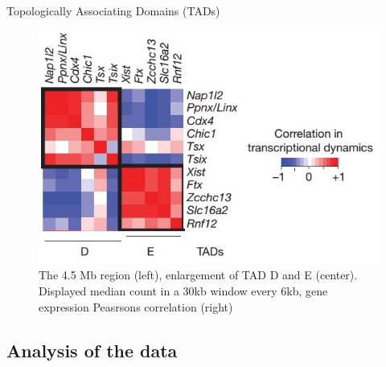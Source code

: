 \documentclass[8pt]{beamer}
\begin{document}
\begin{frame}{Topologically Associating Domains (TADs)}
\begin{figure}[H]
\includegraphics[scale=0.27]{transcriptionCorrelationTadDandENoraEtAl2012}
\caption{\tiny{The 4.5 Mb region (left), enlargement of TAD D and E (center). Displayed median count in a 30kb window every 6kb, gene expression Peasrsons correlation (right)}}
\label{fig:TADsOfTheXChromosome_NoraEtAl2012}
\end{figure}
\end{frame}

\subsection{Analysis of the data}\label{subsection_analysisOfTheData}
\end{document}
